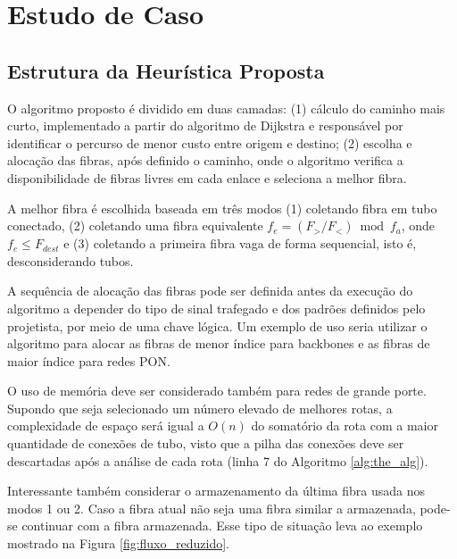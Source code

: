 \section{Estudo de Caso} \label{sec:algorithm}

%
\subsection{Estrutura da Heurística Proposta}

O algoritmo proposto é dividido em duas camadas: (1) cálculo do caminho mais
curto, implementado a partir do algoritmo de Dijkstra e responsável por
identificar o percurso de menor custo entre origem e destino; (2) escolha e
alocação das fibras, após definido o caminho, onde o algoritmo verifica a
disponibilidade de fibras livres em cada enlace e seleciona a melhor fibra.

A melhor fibra é escolhida baseada em três modos (1) coletando fibra em tubo
conectado, (2) coletando uma fibra equivalente $f_e = (F_{>} / {F_{<}}) \bmod
  f_{a}$, onde $f_{e} \leq F_{dest}$ e (3) coletando a primeira
  fibra vaga de forma sequencial, isto é, desconsiderando tubos.

A sequência de alocação das fibras pode ser definida antes da execução do
algoritmo a depender do tipo de sinal trafegado e dos padrões definidos pelo
projetista, por meio de uma chave lógica. Um exemplo de uso seria utilizar o
algoritmo para alocar as fibras de menor índice para backbones e as fibras de
maior índice para redes PON.

O uso de memória deve ser considerado também para redes de grande porte.
Supondo que seja selecionado um número elevado de melhores rotas, a
complexidade de espaço será igual a $O(n)$ do somatório da rota com a maior
quantidade de conexões de tubo, visto que a pilha das conexões deve ser
descartadas após a análise de cada rota (linha 7 do Algoritmo
\ref{alg:the_alg}).

Interessante também considerar o armazenamento da última fibra usada nos modos
1 ou 2. Caso a fibra atual não seja uma fibra similar a armazenada, pode-se
continuar com a fibra armazenada. Esse tipo de situação leva ao exemplo
mostrado na Figura \ref{fig:fluxo_reduzido}.

